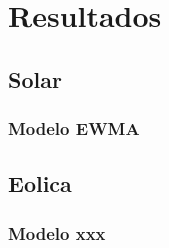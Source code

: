 \chapter{Resultados} %
\label{cha:resultados}

\section{Solar} %
\label{sec:solar}

\subsection{Modelo EWMA} %
\label{sub:modelo_ewma}


\section{Eolica} %
\label{sec:eolica}

\subsection{Modelo xxx} %
\label{sub:modelo_xxx}

